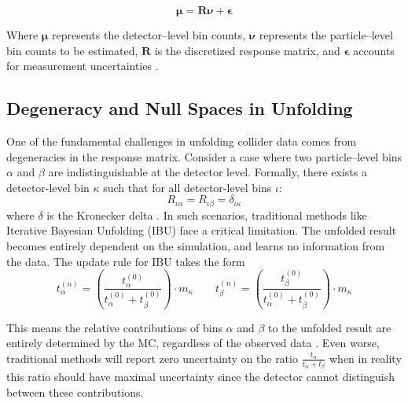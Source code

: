 \begin{equation}
\boldsymbol{\mu} = \mathbf{R} \boldsymbol{\nu} + \boldsymbol{\epsilon}
\end{equation}

Where \(\boldsymbol{\mu}\) represents the detector--level bin counts, \(\boldsymbol{\nu}\) represents the particle--level bin counts to be estimated, $\mathbf{R}$ is the discretized response matrix, and \(\boldsymbol{\epsilon}\) accounts for measurement uncertainties .

\subsection{Degeneracy and Null Spaces in Unfolding}
    One of the fundamental challenges in unfolding collider data comes from degeneracies in the response matrix.
    Consider a case where two particle--level bins $\alpha$ and $\beta$ are indistinguishable at the detector level.
    Formally, there exists a detector-level bin $\kappa$ such that for all detector-level bins $\iota$:
    \begin{equation}
        R_{\iota\alpha} = R_{\iota\beta} = \delta_{\iota\kappa}
    \end{equation}
    where $\delta$ is the Kronecker delta .
    In such scenarios, traditional methods like Iterative Bayesian Unfolding (IBU) face a critical limitation.
    The unfolded result becomes entirely dependent on the simulation, and learns no information from the data.
    The update rule for IBU takes the form
    \begin{equation}
        t_{\alpha}^{(n)} = \left(\frac{t_\alpha^{(0)}}{t_\alpha^{(0)} + t_{\beta}^{(0)}}\right) \cdot m_\kappa
        \qquad
        t_{\beta}^{(n)} = \left(\frac{t_\beta^{(0)}}{t_\alpha^{(0)} + t_{\beta}^{(0)}}\right) \cdot m_\kappa
    \end{equation}

    This means the relative contributions of bins $\alpha$ and $\beta$ to the unfolded result are entirely determined by the MC, regardless of the observed data .
    Even worse, traditional methods will report zero uncertainty on the ratio \(\frac{t_\alpha}{t_\alpha+t_\beta}\) when in reality this ratio should have maximal uncertainty since the detector cannot distinguish between these contributions.

